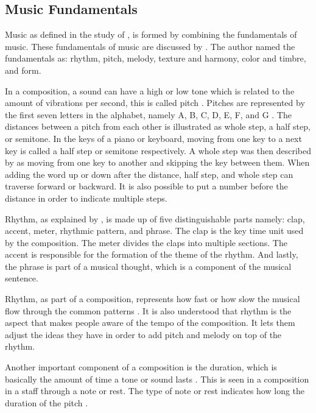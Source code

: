 \subsection{Music Fundamentals}
Music as defined in the study of , is formed by combining the fundamentals of music. These fundamentals of music are discussed by . The author named the fundamentals as: rhythm, pitch, melody, texture and harmony, color and timbre, and form. 

In a composition, a sound can have a high or low tone which is related to the amount of vibrations per second, this is called pitch \cite{rivadelo1986fundamentals}. Pitches are represented by the first seven letters in the alphabet, namely A, B, C, D, E, F, and G \cite{miller2005complete}. The distances between a pitch from each other is illustrated as whole step, a half step, or semitone. In the keys of a piano or keyboard, moving from one key to a next key is called a half step or semitone respectively. A whole step was then described by \citeauthor{rivadelo1986fundamentals} as moving from one key to another and skipping the key between them. When adding the word up or down after the distance, half step, and whole step can traverse forward or backward. It is also possible to put a number before the distance in order to indicate multiple steps. 

Rhythm, as explained by , is made up of five distinguishable parts namely: clap, accent, meter, rhythmic pattern, and phrase. The clap is the key time unit used by the composition. The meter divides the claps into multiple sections. The accent is responsible for the formation of the theme of the rhythm. And lastly, the phrase is part of a musical thought, which is a component of the musical sentence.

Rhythm, as part of a composition, represents how fast or how slow the musical flow through the common patterns \cite{rivadelo1986fundamentals}. It is also understood that rhythm is the aspect that makes people aware of the tempo of the composition. It lets them adjust the ideas they have in order to add pitch and melody on top of the rhythm.

Another important component of a composition is the duration, which is basically the amount of time a tone or sound lasts \cite{rivadelo1986fundamentals}. This is seen in a composition in a staff through a note or rest. The type of note or rest indicates how long the duration of the pitch \cite{rivadelo1986fundamentals}. 

